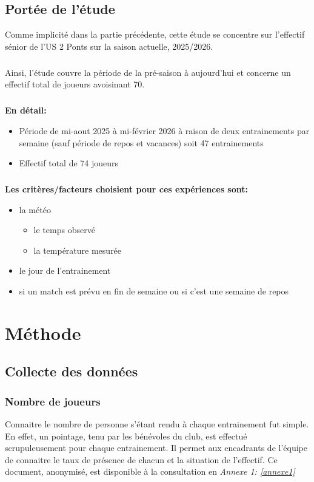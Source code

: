 \documentclass[12pt, a4paper,french]{report}
\begin{document}
  \section{Portée de l'étude}
    Comme implicité dans la partie précédente, cette étude se concentre sur l'effectif sénior de l'US 2 Ponts sur la saison actuelle, 2025/2026.
    \paragraph{} Ainsi, l'étude couvre la période de la pré-saison à aujourd'hui et concerne un effectif total de joueurs avoisinant 70. 
    \paragraph{}\textbf{En détail:}
    \begin{itemize}
      \item Période de mi-aout 2025 à mi-février 2026 à raison de deux entrainements par semaine (sauf période de repos et vacances) soit 47 entrainements 
      \item Effectif total de 74 joueurs\end{itemize} \paragraph{}\textbf{Les critères/facteurs choisient pour ces expériences sont:}
      \begin{itemize}\item la météo\begin{itemize}
        \item le temps observé
        \item la température mesurée
      \end{itemize}
      \item le jour de l'entrainement
      \item si un match est prévu en fin de semaine ou si c'est une semaine de repos
    \end{itemize}

\chapter{Méthode}
  \section{Collecte des données}
    \subsection{Nombre de joueurs}
      Connaitre le nombre de personne s'étant rendu à chaque entrainement fut simple. En effet, un pointage, tenu par les bénévoles du club, est effectué scrupuleusement pour chaque entrainement. Il permet aux encadrants de l'équipe de connaitre le taux de présence de chacun et la situation de l'effectif. Ce document, anonymisé, est disponible à la consultation en \emph{Annexe 1: \ref{annexe1}}
\end{document}
